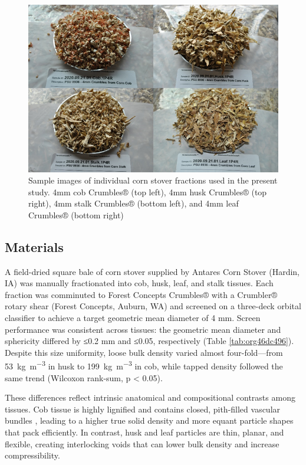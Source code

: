 \documentclass[xcolor=dvipsnames,10pt,hidelinks]{article}
\let\oldsubsection\subsection
\renewcommand{\subsection}{\clearpage\oldsubsection}
\begin{document}
\begin{figure}[htbp]
\centering
\includegraphics[width=.9\linewidth]{figures/image2.png}
\caption{\label{fig:org3e0af7e}Sample images of individual corn stover fractions used in the present study. 4mm cob Crumbles® (top left), 4mm husk Crumbles® (top right), 4mm stalk Crumbles® (bottom left), and 4mm leaf Crumbles® (bottom right)}
\end{figure}
\subsection{Materials}
\label{sec:org9d89b57}
A field-dried square bale of corn stover supplied by Antares Corn Stover (Hardin, IA) was manually fractionated into cob, husk, leaf, and stalk tissues.
Each fraction was comminuted to Forest Concepts Crumbles® with a Crumbler® rotary shear (Forest Concepts, Auburn, WA) and
screened on a three-deck orbital classifier to achieve a target geometric mean diameter of 4 mm.
Screen performance was consistent across tissues:
the geometric mean diameter and sphericity differed by ≤0.2 mm and ≤0.05, respectively (Table \ref{tab:org46dc496}).
Despite this size uniformity, loose bulk density varied almost four-fold—from \qty{53}{\kilo\gram\per\cubic\meter} in husk
to \qty{199}{\kilo\gram\per\cubic\meter} in cob, while tapped density followed the same trend (Wilcoxon rank-sum, p < 0.05).

These differences reflect intrinsic anatomical and compositional contrasts among tissues.
Cob tissue is highly lignified \parencite{berchem_corn_2017} and contains closed, pith-filled vascular bundles \parencite{thornburg_mass_2022},
leading to a higher true solid density and more equant particle shapes that pack efficiently.
In contrast, husk and leaf particles are thin, planar, and flexible, creating interlocking voids \parencite{thornburg_mass_2022,li_characterization_2020} that
can lower bulk density and increase compressibility.
\end{document}
